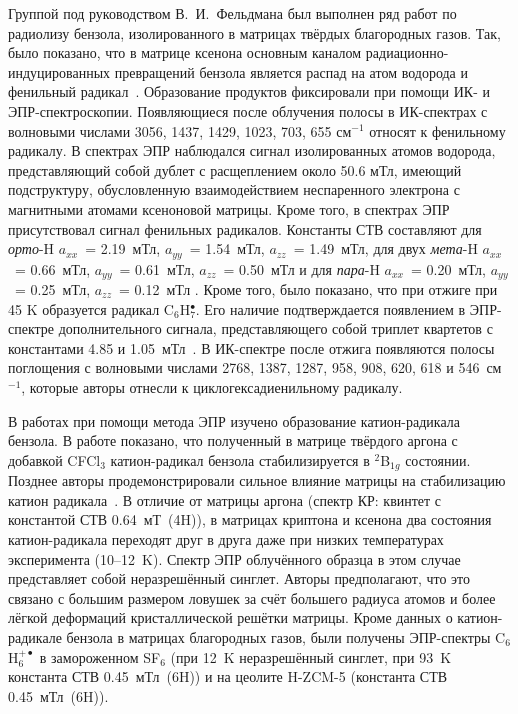 { Группой под руководством В.~И.~Фельдмана был выполнен ряд работ по радиолизу бензола, изолированного в матрицах твёрдых благородных газов. Так, было показано, что в 
 матрице ксенона основным каналом радиационно-индуцированных превращений бензола является распад на атом водорода и фенильный радикал~\cite{Feldman2007}. Образование продуктов фиксировали 
 при помощи ИК-  и ЭПР-спектроскопии. Появляющиеся после облучения полосы в ИК-спектрах с волновыми числами 3056, 1437,
1429, 1023, 703, 655 см$^{-1}$ относят к фенильному радикалу. В спектрах ЭПР наблюдался сигнал изолированных атомов водорода, представляющий собой дублет с расщеплением около 50.6 мТл, имеющий подструктуру, обусловленную взаимодействием
неспаренного электрона с магнитными атомами ксеноновой матрицы. Кроме того, в спектрах ЭПР присутствовал сигнал фенильных радикалов. Константы СТВ составляют для {\it орто}-H $a_{xx}$~= 2.19~мТл,
 $a_{yy}$~= 1.54~мТл, $a_{zz}$~= 1.49~мТл, для двух {\it мета}-H $a_{xx}$~= 0.66~мТл, $a_{yy}$~= 0.61~мТл, $a_{zz}$~= 0.50~мТл и для {\it пара}-H $a_{xx}$~= 0.20~мТл, $a_{yy}$~= 0.25~мТл,
 $a_{zz}$~= 0.12~мТл \cite{Kasai1969}. Кроме того, было показано, что при отжиге при 45 K образуется радикал C$_6$H$_7^\bullet$. Его наличие подтверждается появлением в ЭПР-спектре дополнительного сигнала,
представляющего собой триплет квартетов с константами 4.85 и 1.05~мТл~\cite{Pshezhetskii}. В ИК-спектре после отжига появляются полосы поглощения
 с  волновыми числами 2768, 1387, 1287, 958, 908, 620, 618 и 546~см$^{-1}$, которые авторы \cite{Feldman2007} отнесли к циклогексадиенильному радикалу.
 
В работах \cite{Feldman1999, Feldman2000} при помощи метода ЭПР изучено образование катион-радикала бензола. В работе \cite{Feldman1999} 
показано, что полученный в матрице твёрдого аргона с добавкой CFCl$_3$ катион-радикал бензола стабилизируется в $^2$B$_{1g}$ состоянии. Позднее 
авторы продемонстрировали сильное влияние матрицы на стабилизацию катион радикала~\cite{Feldman2000}. В отличие от матрицы аргона (спектр КР: квинтет с константой СТВ 0.64~мТ~(4H)), в  
матрицах криптона и ксенона два состояния катион-радикала переходят друг в друга даже при низких температурах эксперимента (10--12~K). Спектр ЭПР облучённого образца в этом случае представляет собой неразрешённый синглет.
Авторы предполагают, что
это связано с большим размером ловушек за счёт большего радиуса атомов и более лёгкой деформаций кристаллической решётки матрицы. Кроме данных о катион-радикале бензола в матрицах благородных газов, 
были получены ЭПР-спектры C$_6$H$_6^{+\bullet}$ в замороженном SF$_6$ (при 12~K неразрешённый синглет, при 93~K константа СТВ 0.45~мТл~(6H)) и на цеолите H-ZCM-5 (константа СТВ 0.45~мТл~(6H)).

}
